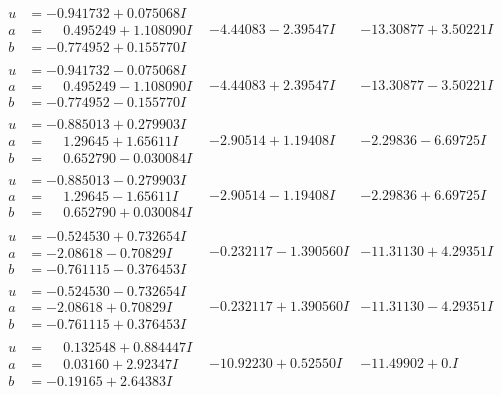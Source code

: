 \documentclass[1p]{elsarticle_modified}
\theoremstyle{definition}
\begin{document}
$$\begin{array}{c|c|c}
\begin{aligned}
u &= -0.941732 + 0.075068 I \\
a &= \phantom{-}0.495249 + 1.108090 I \\
b &= -0.774952 + 0.155770 I\end{aligned}
 & -4.44083 - 2.39547 I & -13.30877 + 3.50221 I \\ \hline\begin{aligned}
u &= -0.941732 - 0.075068 I \\
a &= \phantom{-}0.495249 - 1.108090 I \\
b &= -0.774952 - 0.155770 I\end{aligned}
 & -4.44083 + 2.39547 I & -13.30877 - 3.50221 I \\ \hline\begin{aligned}
u &= -0.885013 + 0.279903 I \\
a &= \phantom{-}1.29645 + 1.65611 I \\
b &= \phantom{-}0.652790 - 0.030084 I\end{aligned}
 & -2.90514 + 1.19408 I & -2.29836 - 6.69725 I \\ \hline\begin{aligned}
u &= -0.885013 - 0.279903 I \\
a &= \phantom{-}1.29645 - 1.65611 I \\
b &= \phantom{-}0.652790 + 0.030084 I\end{aligned}
 & -2.90514 - 1.19408 I & -2.29836 + 6.69725 I \\ \hline\begin{aligned}
u &= -0.524530 + 0.732654 I \\
a &= -2.08618 - 0.70829 I \\
b &= -0.761115 - 0.376453 I\end{aligned}
 & -0.232117 - 1.390560 I & -11.31130 + 4.29351 I \\ \hline\begin{aligned}
u &= -0.524530 - 0.732654 I \\
a &= -2.08618 + 0.70829 I \\
b &= -0.761115 + 0.376453 I\end{aligned}
 & -0.232117 + 1.390560 I & -11.31130 - 4.29351 I \\ \hline\begin{aligned}
u &= \phantom{-}0.132548 + 0.884447 I \\
a &= \phantom{-}0.03160 + 2.92347 I \\
b &= -0.19165 + 2.64383 I\end{aligned}
 & -10.92230 + 0.52550 I & -11.49902 + 0. I\phantom{ +0.000000I} \\ \hline\begin{aligned}

\end{aligned}
\end{array}$$
\end{document}
